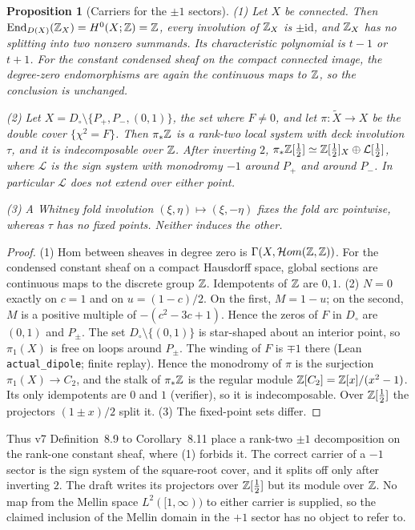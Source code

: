 \documentclass[11pt]{article}
\newtheorem{proposition}[theorem]{Proposition}
\theoremstyle{definition}\newtheorem{definition}[theorem]{Definition}
\theoremstyle{remark}\newtheorem{remark}[theorem]{Remark}
\newcommand{\End}{\operatorname{End}}\newcommand{\inte}{\operatorname{int}}
\begin{document}
\begin{proposition}[Carriers for the $\pm1$ sectors]\label{prop:carrier}
(1) Let $X$ be connected. Then $\End_{D(X)}(\Z_X)=H^0(X;\Z)=\Z$, every
involution of $\mathbb Z_X$ is $\pm\mathrm{id}$, and $\mathbb Z_X$ has no splitting into two
nonzero summands. Its characteristic polynomial is $t-1$ or $t+1$. For the constant
condensed sheaf on the compact connected image, the degree-zero endomorphisms
are again the continuous maps to $\mathbb Z$, so the conclusion is unchanged.

(2) Let $X=D_\circ\setminus\{P_+,P_-,(0,1)\}$, the set where $F\neq0$, and let
$\pi:\widetilde X\to X$ be the
double cover $\{\chi^2=F\}$. Then $\pi_*\mathbb Z$ is a rank-two local system with deck
involution $\tau$, and it is indecomposable over $\mathbb Z$. After inverting $2$,
$\pi_*\mathbb Z[\frac12]\simeq\mathbb Z[\frac12]_X\oplus\mathcal L[\frac12]$, where
$\mathcal L$ is the sign system with monodromy $-1$ around $P_+$ and around
$P_-$. In particular $\mathcal L$ does not extend over either point.

(3) A Whitney fold involution $(\xi,\eta)\mapsto(\xi,-\eta)$ fixes the fold arc
pointwise, whereas $\tau$ has no fixed points. Neither induces the other.
\end{proposition}
\begin{proof}
(1) Hom between sheaves in degree zero is $\Gamma(X,\mathcal Hom(\mathbb Z,\mathbb Z))$. For the
condensed constant sheaf on a compact Hausdorff space, global sections are
continuous maps to the discrete group $\mathbb Z$. Idempotents of $\mathbb Z$ are $0,1$.
(2) $N=0$ exactly on $c=1$ and on $u=(1-c)/2$. On the first, $M=1-u$; on the
second, $M$ is a positive multiple of $-(c^2-3c+1)$. Hence the zeros of $F$ in
$D_\circ$ are $(0,1)$ and $P_\pm$. The set $D_\circ\setminus\{(0,1)\}$ is
star-shaped about an interior point, so $\pi_1(X)$ is free on loops around $P_\pm$. The winding of $F$ is $\mp1$
there (Lean \texttt{actual\_dipole}; finite replay). Hence the monodromy of
$\pi$ is the surjection $\pi_1(X)\to C_2$, and the stalk of $\pi_*\mathbb Z$ is the
regular module $\mathbb Z[C_2]=\mathbb Z[x]/(x^2-1)$. Its only idempotents are $0$ and $1$
(verifier), so it is indecomposable. Over $\mathbb Z[\frac12]$ the projectors
$(1\pm x)/2$ split it.
(3) The fixed-point sets differ.
\end{proof}

Thus v7 Definition~8.9 to Corollary~8.11 place a rank-two $\pm1$ decomposition
on the rank-one constant sheaf, where (1) forbids it. The correct carrier of a
$-1$ sector is the sign system of the square-root cover, and it splits off
only after inverting $2$. The draft writes its projectors over $\mathbb Z[\frac12]$ but
its module over $\mathbb Z$. No map from the Mellin space $L^2([1,\infty))$ to either
carrier is supplied, so the claimed inclusion of the Mellin domain in the
$+1$ sector has no object to refer to.
\end{document}
